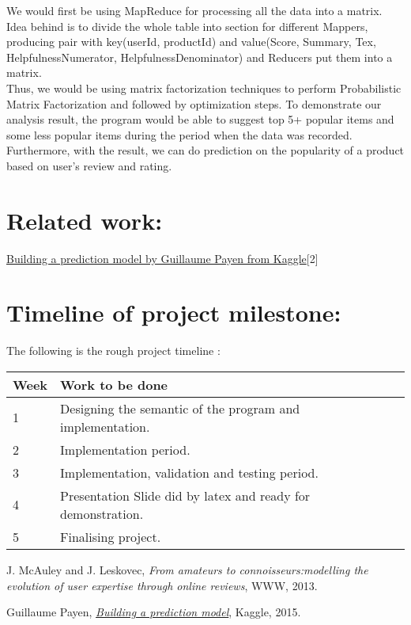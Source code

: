 \documentclass[12pt]{article}
\begin{document}
We would first be using MapReduce for processing all the data into a matrix. Idea behind is to divide the whole table into section for different Mappers, producing pair with key(userId, productId) and value(Score, Summary, Tex, HelpfulnessNumerator, HelpfulnessDenominator) and Reducers put them into a matrix.\\

Thus, we would be using matrix factorization techniques to perform Probabilistic Matrix Factorization and followed by optimization steps.
To demonstrate our analysis result, the program would be able to suggest top 5+ popular items and some less popular items during the period when the data was recorded. Furthermore, with the result, we can do prediction on the popularity of a product based on user's review and rating.

\section{Related work:}
\href{https://www.kaggle.com/gpayen/building-a-prediction-model}{Building a prediction model by Guillaume Payen from Kaggle}[2]
\section{Timeline of project milestone:}
The following is the rough project timeline :
\begin{center}
    \begin{tabular}{| l | l | l | l |}
    \hline
    Week & Work to be done \\ \hline
    1 &  Designing the semantic of the program and implementation.\\ \hline
    2 &  Implementation period.\\ \hline
    3 &  Implementation, validation and testing period.\\ \hline
    4 &  Presentation Slide did by latex and ready for demonstration. \\ \hline
    5 &  Finalising project. \\ \hline
    
    \end{tabular}
\end{center}


\begin{thebibliography}{1}

	J. McAuley and J. Leskovec,
	{\em From amateurs to connoisseurs:modelling the evolution of user expertise through online reviews},
	WWW,
	2013.
	
	Guillaume Payen,
	\href{https://www.kaggle.com/gpayen/building-a-prediction-model}{{\em Building a prediction model}},
	Kaggle,
	2015.

\end{thebibliography}
\end{document}
